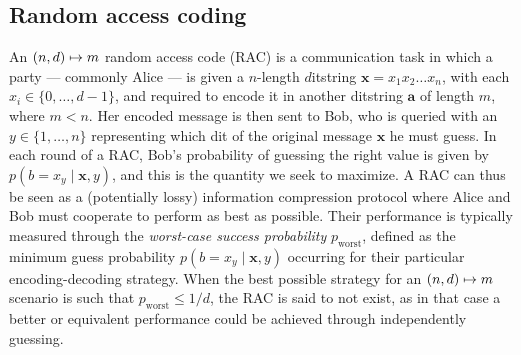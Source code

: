         \subsection{Random access coding}
        \label{sec:racs}

            An $\left( n, d \right) \mapsto m$ random access code (RAC) is a communication task in which a party --- commonly Alice --- is given a $n$-length $d$itstring $\mathbf{x} = x_1 x_2 \ldots x_n$, with each $x_i \in \{0, \ldots, d - 1 \}$, and required to encode it in another ditstring $\mathbf{a}$ of length $m$, where $m < n$. Her encoded message is then sent to Bob, who is queried with an $y \in \{1, \ldots, n\}$ representing which dit of the original message $\mathbf{x}$ he must guess. In each round of a RAC, Bob's probability of guessing the right value is given by $p(b = x_y \mid \mathbf{x}, y)$, and this is the quantity we seek to maximize. A RAC can thus be seen as a (potentially lossy) information compression protocol where Alice and Bob must cooperate to perform as best as possible. Their performance is typically measured through the \emph{worst-case success probability} $p_{\text{worst}}$, defined as the minimum guess probability $p(b = x_y \mid \mathbf{x}, y)$ occurring for their particular encoding-decoding strategy. When the best possible strategy for an $\left( n, d \right) \mapsto m$ scenario is such that $p_{\text{worst}} \leq 1/d$, the RAC is said to not exist, as in that case a better or equivalent performance could be achieved through independently guessing.

